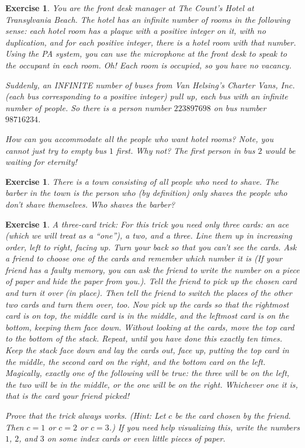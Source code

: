 \documentclass{book}
\newcounter{ekcounter}%
\theoremstyle{ekimcustom}
\newtheorem{exercise}[ekcounter]{Exercise}
\begin{document}
\begin{exercise}
You are the front desk manager at The Count's Hotel at Transylvania Beach. The hotel has an infinite number of rooms in the following sense: each hotel room has a plaque with a positive integer on it, with no duplication, and for each positive integer, there is a hotel room with that number. Using the PA system, you can use the microphone at the front desk to speak to the occupant in each room. Oh! Each room is occupied, so you have no vacancy. 

Suddenly, an INFINITE number of buses from Van Helsing's Charter Vans, Inc. (each bus corresponding to a positive integer) pull up, each bus with an infinite number of people. So there is a person number $223897698$ on bus number $98716234$.

How can you accommodate all the people who want hotel rooms? Note, you cannot just try to empty bus $1$ first. Why not? The first person in bus $2$ would be waiting for eternity!
\end{exercise}


\begin{exercise}
There is a town consisting of all people who need to shave. The barber in the town is the person who (by definition) only shaves the people who don't shave themselves. Who shaves the barber?
\end{exercise}

\begin{exercise}
A three-card trick: For this trick you need only three cards: an ace (which we will treat as
a ``one''), a two, and a three. Line them up in increasing order, left to right, facing up.
Turn your back so that you can’t see the cards. Ask a friend to choose one of the cards
and remember which number it is (If your friend has a faulty memory, you can ask the
friend to write the number on a piece of paper and hide the paper from you.). Tell the
friend to pick up the chosen card and turn it over (in place). Then tell the friend to switch
the places of the other two cards and turn them over, too.
Now pick up the cards so that the rightmost card is on top, the middle card is in the
middle, and the leftmost card is on the bottom, keeping them face down. Without looking
at the cards, move the top card to the bottom of the stack. Repeat, until you have done
this exactly ten times. Keep the stack face down and lay the cards out, face up, putting
the top card in the middle, the second card on the right, and the bottom card on the left.
Magically, exactly one of the following will be true: the three will be on the left, the two
will be in the middle, or the one will be on the right. Whichever one it is, that is the card
your friend picked!

Prove that the trick always works. (Hint: Let $c$ be the card chosen by the friend. Then $c=1$ or $c=2$ or $c=3$.) If you need help visualizing this, write the numbers $1$, $2$, and $3$ on some index cards or even little pieces of paper.
\end{exercise}
\end{document}
